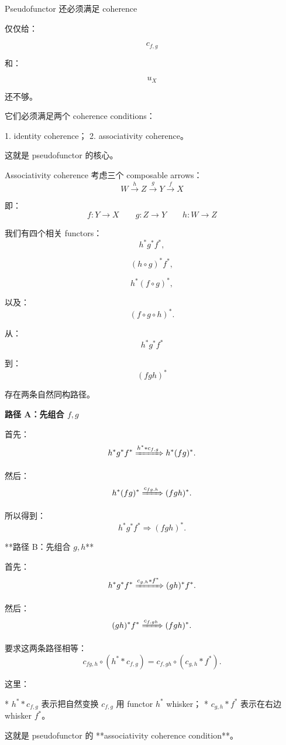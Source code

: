 \documentclass{beamer}
\begin{document}
\begin{frame}[fragile]{Pseudofunctor 还必须满足 coherence}
\begin{markdown}
仅仅给：

$$
c_{f,g}
$$

和：

$$
u_X
$$

还不够。

它们必须满足两个 coherence conditions：

1. identity coherence；
2. associativity coherence。

这就是 pseudofunctor 的核心。
\end{markdown}
\end{frame}

\begin{frame}{Associativity coherence}
考虑三个 composable arrows：
$$
W\xrightarrow{h}Z\xrightarrow{g}Y\xrightarrow{f}X
$$

即：
$$
f:Y\to X
\qquad
g:Z\to Y
\qquad
h:W\to Z
$$

我们有四个相关 functors：
$$
h^*g^*f^*,
$$

$$
(h\circ g)^*f^*,
$$

$$
h^*(f\circ g)^*,
$$

以及：
$$
(f\circ g\circ h)^*.
$$

从：
$$
h^*g^*f^*
$$

到：
$$
(fgh)^*
$$

存在两条自然同构路径。
\end{frame}

\begin{frame}[fragile]
\textbf{路径 A：先组合 $f,g$}

首先：
$$
h^*g^*f^*
\xRightarrow{h^**c_{f,g}}
h^*(fg)^*.
$$

然后：
$$
h^*(fg)^*
\xRightarrow{c_{fg,h}}
(fgh)^*.
$$

所以得到：
$$
h^*g^*f^*
\Longrightarrow
(fgh)^*.
$$
\end{frame}

\begin{frame}[fragile]
\begin{markdown}
**路径 B：先组合 $g,h$**

首先：
$$
h^*g^*f^*
\xRightarrow{c_{g,h}*f^*}
(gh)^*f^*.
$$

然后：
$$
(gh)^*f^*
\xRightarrow{c_{f,gh}}
(fgh)^*.
$$

要求这两条路径相等：
$$
\boxed{
c_{fg,h}\circ(h^**c_{f,g}) =
c_{f,gh}\circ(c_{g,h}*f^*).
}
$$

这里：

* $h^**c_{f,g}$ 表示把自然变换 $c_{f,g}$ 用 functor $h^*$ whisker；
* $c_{g,h}*f^*$ 表示在右边 whisker $f^*$。

这就是 pseudofunctor 的 **associativity coherence condition**。
\end{markdown}
\end{frame}
\end{document}
